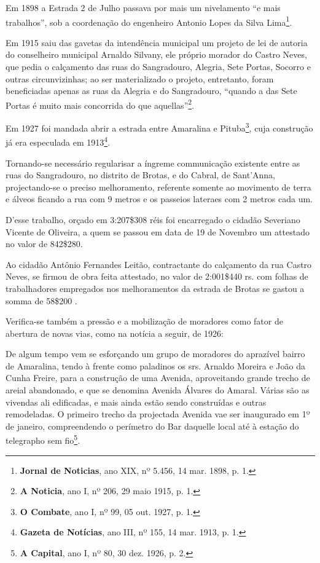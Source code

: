 Em 1898 a Estrada 2 de Julho passava por mais um nivelamento ``e mais trabalhos'', sob a coordenação do engenheiro Antonio Lopes da Silva Lima\footnote{\textbf{Jornal de Noticias}, ano XIX, nº 5.456, 14 mar. 1898, p. 1.}.

Em 1915 saiu das gavetas da intendência municipal um projeto de lei de autoria do conselheiro municipal Arnaldo Silvany, ele próprio morador do Castro Neves, que pedia o calçamento das ruas do Sangradouro, Alegria, Sete Portas, Socorro e outras circunvizinhas; ao ser materializado o projeto, entretanto, foram beneficiadas apenas as ruas da Alegria e do Sangradouro, ``quando a das Sete Portas é muito mais concorrida do que aquellas''\footnote{\textbf{A Noticia}, ano I, nº 206, 29 maio 1915, p. 1.}.

Em 1927 foi mandada abrir a estrada entre Amaralina e Pituba\footnote{\textbf{O Combate}, ano I, nº 99, 05 out. 1927, p. 1.}, cuja construção já era especulada em 1913\footnote{\textbf{Gazeta de Notícias}, ano III, nº 155, 14 mar. 1913, p. 1.}.



\begin{citacao}
Tornando-se necessário regularisar a íngreme communicação existente entre as ruas do Sangradouro, no distrito de Brotas, e do Cabral, de Sant'Anna, projectando-se o preciso melhoramento, referente somente ao movimento de terra e álveos ficando a rua com 9 metros e os passeios lateraes com 2 metros cada um.

D'esse trabalho, orçado em 3:207\$308 réis foi encarregado o cidadão Severiano Vicente de Oliveira, a quem se passou em data de 19 de Novembro um attestado no valor de 842\$280.
\end{citacao}



\begin{citacao}
Ao cidadão Antônio Fernandes Leitão, contractante do calçamento da rua Castro Neves, se firmou de obra feita attestado, no valor de 2:001\$440 rs. com folhas de trabalhadores empregados nos melhoramentos da estrada de Brotas se gastou a somma de 58\$200 \cite[p.~]{salvador_relatorio_1896}.
\end{citacao}


Verifica-se também a pressão e a mobilização de moradores como fator de abertura de novas vias, como na notícia a seguir, de 1926:

\begin{citacao}
De algum tempo vem se esforçando um grupo de moradores do aprazível bairro de Amaralina, tendo à frente como paladinos os srs. Arnaldo Moreira e João da Cunha Freire, para a construção de uma Avenida, aproveitando grande trecho de areial abandonado, e que se denomina Avenida Álvares do Amaral.
Várias são as vivendas ali edificadas, e mais ainda estão sendo construídas e outras remodeladas.
O primeiro trecho da projectada Avenida vae ser inaugurado em 1º de janeiro, compreendendo o perímetro do Bar daquelle local até à estação do telegrapho sem fio\footnote{\textbf{A Capital}, ano I, nº 80, 30 dez. 1926, p. 2. }.
\end{citacao}

